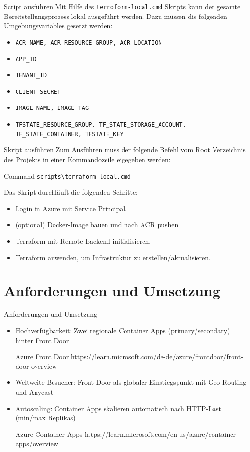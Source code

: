 \documentclass{beamer}
\begin{document}
\begin{frame}[fragile]{Script ausführen}
  Mit Hilfe des \texttt{terroform-local.cmd} Skripts kann der gesamte Bereitstellungsprozess lokal ausgeführt werden. Dazu müssen die folgenden Umgebungsvariables gesetzt werden:
  \begin{itemize}
    \item \texttt{ACR\_NAME, ACR\_RESOURCE\_GROUP, ACR\_LOCATION}
    \item \texttt{APP\_ID}
    \item \texttt{TENANT\_ID}
    \item \texttt{CLIENT\_SECRET}
    \item \texttt{IMAGE\_NAME, IMAGE\_TAG}
    \item \texttt{TFSTATE\_RESOURCE\_GROUP, TF\_STATE\_STORAGE\_ACCOUNT, TF\_STATE\_CONTAINER, TFSTATE\_KEY}
  \end{itemize}
\end{frame}
\begin{frame}{Skript ausführen}
  Zum Ausführen muss der folgende Befehl vom Root Verzeichnis des Projekts in einer Kommandozeile eigegeben werden:
  \begin{block}{Command}
    \texttt{scripts\textbackslash terraform-local.cmd}
  \end{block}
  Das Skript durchläuft die folgenden Schritte:
  \begin{itemize}
    \item Login in Azure mit Service Principal.
    \item (optional) Docker-Image bauen und nach ACR pushen.
    \item Terraform mit Remote-Backend initialisieren.
    \item Terraform anwenden, um Infrastruktur zu erstellen/aktualisieren.
  \end{itemize}
\end{frame}

\section{Anforderungen und Umsetzung}
\begin{frame}{Anforderungen und Umsetzung}
  \begin{itemize}
    \item Hochverfügbarkeit: Zwei regionale Container Apps (primary/secondary) hinter Front Door
    \begin{block}{Azure Front Door}
       https://learn.microsoft.com/de-de/azure/frontdoor/front-door-overview
    \end{block}
    \item Weltweite Besucher: Front Door als globaler Einstiegspunkt mit Geo-Routing und Anycast.
    \item Autoscaling: Container Apps skalieren automatisch nach HTTP-Last (min/max Replikas)  
     \begin{block}{Azure Container Apps}
https://learn.microsoft.com/en-us/azure/container-apps/overview

  \end{block}
  \end{itemize}
\end{frame}
\end{document}
